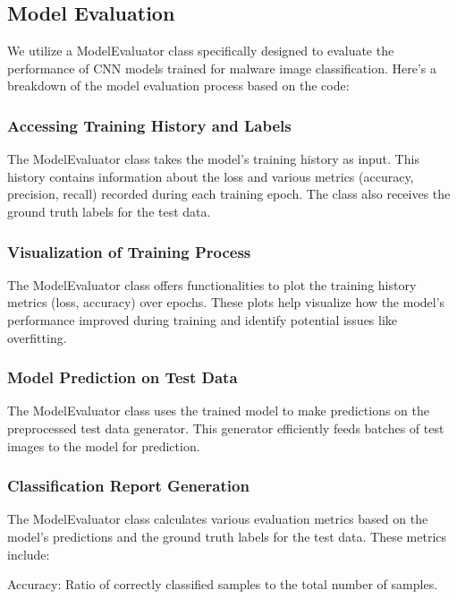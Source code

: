 \documentclass[conference]{IEEEtran}
\begin{document}
\subsection{Model Evaluation}
We utilize a ModelEvaluator class specifically designed to evaluate the performance of CNN models trained for malware image classification. Here's a breakdown of the model evaluation process based on the code:

\subsubsection{Accessing Training History and Labels}

    The ModelEvaluator class  takes the model's training history as input. This history contains information about the loss and various metrics (accuracy, precision, recall) recorded during each training epoch.
    The class also receives the ground truth labels for the test data.

\subsubsection{Visualization of Training Process}

    The ModelEvaluator class  offers functionalities to plot the training history metrics (loss, accuracy) over epochs. These plots help visualize how the model's performance improved during training and identify potential issues like overfitting.

\subsubsection{Model Prediction on Test Data}

    The ModelEvaluator class uses the trained model to make predictions on the preprocessed test data generator. This generator efficiently feeds batches of test images to the model for prediction.

\subsubsection{Classification Report Generation}

    The ModelEvaluator class  calculates various evaluation metrics based on the model's predictions and the ground truth labels for the test data. These metrics include:
        
        Accuracy: Ratio of correctly classified samples to the total number of samples.
        
\end{document}
